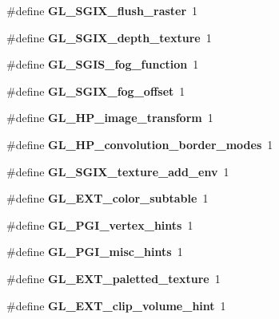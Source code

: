 \begin{DoxyCompactItemize}
\item 
\#define {\bfseries G\+L\+\_\+\+S\+G\+I\+X\+\_\+flush\+\_\+raster}~1\label{_s_d_l__opengl_8h_a4e2b7ca2a7e3a834f994767bd9cea366}

\item 
\#define {\bfseries G\+L\+\_\+\+S\+G\+I\+X\+\_\+depth\+\_\+texture}~1\label{_s_d_l__opengl_8h_a88c73528ba800bff6d9640ef6bc63832}

\item 
\#define {\bfseries G\+L\+\_\+\+S\+G\+I\+S\+\_\+fog\+\_\+function}~1\label{_s_d_l__opengl_8h_a2946015cf2402168a1c55f673052cafe}

\item 
\#define {\bfseries G\+L\+\_\+\+S\+G\+I\+X\+\_\+fog\+\_\+offset}~1\label{_s_d_l__opengl_8h_ab2639e4d2739a6bdc4a24730f70abfa4}

\item 
\#define {\bfseries G\+L\+\_\+\+H\+P\+\_\+image\+\_\+transform}~1\label{_s_d_l__opengl_8h_a70001ecf57693a3c43dd6944ecdec031}

\item 
\#define {\bfseries G\+L\+\_\+\+H\+P\+\_\+convolution\+\_\+border\+\_\+modes}~1\label{_s_d_l__opengl_8h_a67b10e3533683a9081f0116b0d34cd9a}

\item 
\#define {\bfseries G\+L\+\_\+\+S\+G\+I\+X\+\_\+texture\+\_\+add\+\_\+env}~1\label{_s_d_l__opengl_8h_a5f1d918f8d1a61e60694770ffb89c5e2}

\item 
\#define {\bfseries G\+L\+\_\+\+E\+X\+T\+\_\+color\+\_\+subtable}~1\label{_s_d_l__opengl_8h_a36a4b21eddbee667567ab2a9865bd7b6}

\item 
\#define {\bfseries G\+L\+\_\+\+P\+G\+I\+\_\+vertex\+\_\+hints}~1\label{_s_d_l__opengl_8h_a040b2f714c50e8bbbec509e2647f78b6}

\item 
\#define {\bfseries G\+L\+\_\+\+P\+G\+I\+\_\+misc\+\_\+hints}~1\label{_s_d_l__opengl_8h_aae71305743b00af82af3d6c9e06ea387}

\item 
\#define {\bfseries G\+L\+\_\+\+E\+X\+T\+\_\+paletted\+\_\+texture}~1\label{_s_d_l__opengl_8h_a272edcafa8078f19e6057cc06b183962}

\item 
\#define {\bfseries G\+L\+\_\+\+E\+X\+T\+\_\+clip\+\_\+volume\+\_\+hint}~1\label{_s_d_l__opengl_8h_aeffce098a4a38a3f3a1232f2d51bb176}


\end{DoxyCompactItemize}

